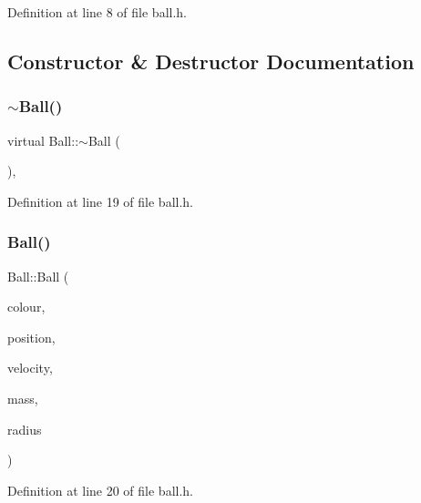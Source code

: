 Definition at line 8 of file ball.\+h.



\subsection{Constructor \& Destructor Documentation}
\mbox{\label{class_ball_a78aa1f06b39fc9f81df82bef399c475c}} 
\subsubsection{\texorpdfstring{$\sim$\+Ball()}{~Ball()}}
{\footnotesize\ttfamily virtual Ball\+::$\sim$\+Ball (\begin{DoxyParamCaption}{ }\end{DoxyParamCaption})\hspace{0.3cm}{\ttfamily [inline]}, {\ttfamily [virtual]}}



Definition at line 19 of file ball.\+h.

\mbox{\label{class_ball_a81d492bd26dc3b4583da0b709375bbac}} 
\subsubsection{\texorpdfstring{Ball()}{Ball()}\hspace{0.1cm}{\footnotesize\ttfamily [1/2]}}
{\footnotesize\ttfamily Ball\+::\+Ball (\begin{DoxyParamCaption}\item[{Q\+Color}]{colour,  }\item[{Q\+Vector2D}]{position,  }\item[{Q\+Vector2D}]{velocity,  }\item[{double}]{mass,  }\item[{int}]{radius }\end{DoxyParamCaption})\hspace{0.3cm}{\ttfamily [inline]}}



Definition at line 20 of file ball.\+h.

\mbox{\label{class_ball_a86a144d3dad6c953e422e32435923bbb}} 
